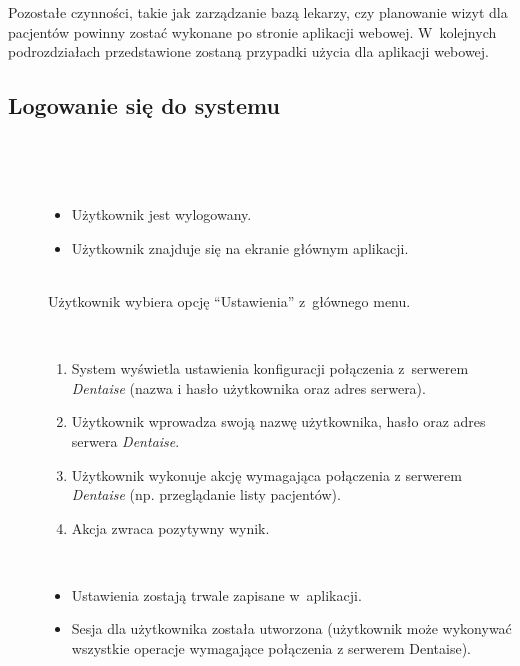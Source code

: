 \documentclass[11pt]{aghdpl}
\begin{document}
Pozostałe czynności, takie jak zarządzanie bazą lekarzy, czy planowanie wizyt dla pacjentów powinny zostać wykonane po stronie aplikacji webowej. W~kolejnych podrozdziałach przedstawione zostaną przypadki użycia dla aplikacji webowej.

\subsection{Logowanie się do systemu}
	
	\begin{description}
		\item[\useCaseAktor] \hfill \\
			\useCaseUzytkownik
		\item[\useCaseWarPocz] \hfill \\
			\begin{itemize}
				\item Użytkownik jest wylogowany.
				\item Użytkownik znajduje się na ekranie głównym aplikacji.
			\end{itemize}
		\item[\useCaseZdarzInicj] \hfill \\
			Użytkownik wybiera opcję ``Ustawienia'' z~głównego menu.
		\item[\useCaseScenBaz] \hfill \\ 
			\begin{enumerate}
				\item System wyświetla ustawienia konfiguracji połączenia z~serwerem \emph{Dentaise} (nazwa i hasło użytkownika oraz adres serwera).
				\item Użytkownik wprowadza swoją nazwę użytkownika, hasło oraz adres serwera \emph{Dentaise}.
				\item Użytkownik wykonuje akcję wymagająca połączenia z serwerem \emph{Dentaise} (np. przeglądanie listy pacjentów).
				\item Akcja zwraca pozytywny wynik.
			\end{enumerate}
		\item[\useCaseWarKonc] \hfill \\ 
			\begin{itemize}
				\item Ustawienia zostają trwale zapisane w~aplikacji.
				\item Sesja dla użytkownika została utworzona (użytkownik może wykonywać wszystkie operacje wymagające połączenia z serwerem Dentaise).

\end{itemize}
\end{description}
\end{document}
